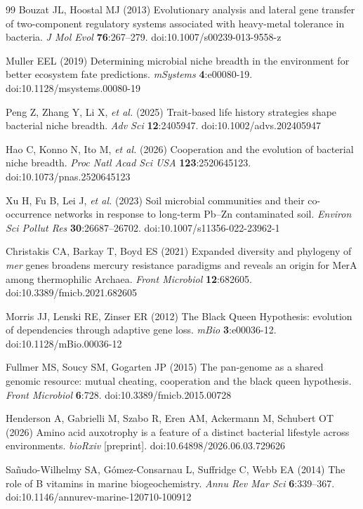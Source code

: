 \documentclass[times]{zHenriquesLab-StyleBioRxiv}
\begin{document}
\begin{thebibliography}{99}
Bouzat JL, Hoostal MJ (2013) Evolutionary analysis and lateral gene transfer
of two-component regulatory systems associated with heavy-metal tolerance in
bacteria. \textit{J Mol Evol} \textbf{76}:267--279.
doi:10.1007/s00239-013-9558-z

Muller EEL (2019) Determining microbial niche breadth in the environment for
better ecosystem fate predictions. \textit{mSystems} \textbf{4}:e00080-19.
doi:10.1128/msystems.00080-19

Peng Z, Zhang Y, Li X, \textit{et al.} (2025) Trait-based life history
strategies shape bacterial niche breadth. \textit{Adv Sci}
\textbf{12}:2405947. doi:10.1002/advs.202405947

Hao C, Konno N, Ito M, \textit{et al.} (2026) Cooperation and the
evolution of bacterial niche breadth. \textit{Proc Natl Acad Sci USA}
\textbf{123}:2520645123. doi:10.1073/pnas.2520645123

Xu H, Fu B, Lei J, \textit{et al.} (2023) Soil microbial communities and
their co-occurrence networks in response to long-term Pb--Zn contaminated
soil. \textit{Environ Sci Pollut Res} \textbf{30}:26687--26702.
doi:10.1007/s11356-022-23962-1

Christakis CA, Barkay T, Boyd ES (2021) Expanded diversity and phylogeny
of \textit{mer} genes broadens mercury resistance paradigms and reveals an
origin for MerA among thermophilic Archaea. \textit{Front Microbiol}
\textbf{12}:682605. doi:10.3389/fmicb.2021.682605

Morris JJ, Lenski RE, Zinser ER (2012) The Black Queen Hypothesis: evolution
of dependencies through adaptive gene loss. \textit{mBio} \textbf{3}:e00036-12.
doi:10.1128/mBio.00036-12

Fullmer MS, Soucy SM, Gogarten JP (2015) The pan-genome as a shared genomic
resource: mutual cheating, cooperation and the black queen hypothesis.
\textit{Front Microbiol} \textbf{6}:728. doi:10.3389/fmicb.2015.00728

Henderson A, Gabrielli M, Szabo R, Eren AM, Ackermann M, Schubert OT (2026)
Amino acid auxotrophy is a feature of a distinct bacterial lifestyle across
environments. \textit{bioRxiv} [preprint].
doi:10.64898/2026.06.03.729626

Sañudo-Wilhelmy SA, Gómez-Consarnau L, Suffridge C, Webb EA (2014) The role
of B vitamins in marine biogeochemistry. \textit{Annu Rev Mar Sci}
\textbf{6}:339--367. doi:10.1146/annurev-marine-120710-100912


\end{thebibliography}
\end{document}

